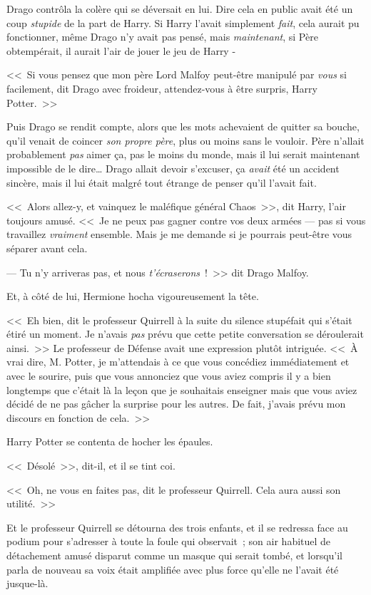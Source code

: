 Drago contrôla la colère qui se déversait en lui. Dire cela en public avait été un coup \emph{stupide} de la part de Harry. Si Harry l'avait simplement \emph{fait}, cela aurait pu fonctionner, même Drago n'y avait pas pensé, mais \emph{maintenant}, si Père obtempérait, il aurait l'air de jouer le jeu de Harry -

<<~Si vous pensez que mon père Lord Malfoy peut-être manipulé par \emph{vous} si facilement, dit Drago avec froideur, attendez-vous à être surpris, Harry Potter.~>>

Puis Drago se rendit compte, alors que les mots achevaient de quitter sa bouche, qu'il venait de coincer \emph{son propre père}, plus ou moins sans le vouloir. Père n'allait probablement \emph{pas} aimer ça, pas le moins du monde, mais il lui serait maintenant impossible de le dire… Drago allait devoir s'excuser, ça \emph{avait} été un accident sincère, mais il lui était malgré tout étrange de penser qu'il l'avait fait.

<<~Alors allez-y, et vainquez le maléfique général Chaos~>>, dit Harry, l'air toujours amusé. <<~Je ne peux pas gagner contre vos deux armées — pas si vous travaillez \emph{vraiment} ensemble. Mais je me demande si je pourrais peut-être vous séparer avant cela.

--- Tu n'y arriveras pas, et nous \emph{t'écraserons}~!~>> dit Drago Malfoy.

Et, à côté de lui, Hermione hocha vigoureusement la tête.

<<~Eh bien, dit le professeur Quirrell à la suite du silence stupéfait qui s'était étiré un moment. Je n'avais \emph{pas} prévu que cette petite conversation se déroulerait ainsi.~>> Le professeur de Défense avait une expression plutôt intriguée. <<~À vrai dire, M. Potter, je m'attendais à ce que vous concédiez immédiatement et avec le sourire, puis que vous annonciez que vous aviez compris il y a bien longtemps que c'était là la leçon que je souhaitais enseigner mais que vous aviez décidé de ne pas gâcher la surprise pour les autres. De fait, j'avais prévu mon discours en fonction de cela.~>>

Harry Potter se contenta de hocher les épaules.

<<~Désolé~>>, dit-il, et il se tint coi.

<<~Oh, ne vous en faites pas, dit le professeur Quirrell. Cela aura aussi son utilité.~>>

Et le professeur Quirrell se détourna des trois enfants, et il se redressa face au podium pour s'adresser à toute la foule qui observait~; son air habituel de détachement amusé disparut comme un masque qui serait tombé, et lorsqu'il parla de nouveau sa voix était amplifiée avec plus force qu'elle ne l'avait été jusque-là.

